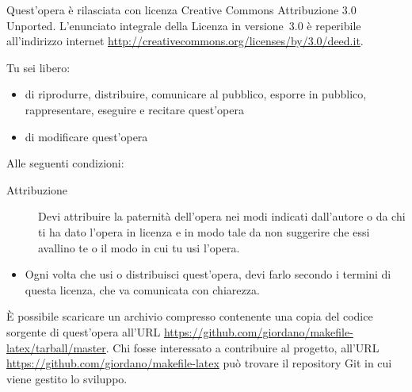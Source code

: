 \noindent Quest'opera è rilasciata con licenza Creative Commons Attribuzione 3.0
Unported.  L'enunciato integrale della Licenza in versione~3.0 è reperibile
all'indirizzo internet \url{http://creativecommons.org/licenses/by/3.0/deed.it}.

Tu sei libero:
\begin{itemize}
\item di riprodurre, distribuire, comunicare al pubblico, esporre in pubblico,
  rappresentare, eseguire e recitare quest'opera
\item di modificare quest'opera
\end{itemize}
Alle seguenti condizioni:
\begin{description}
\item[Attribuzione] Devi attribuire la paternità dell'opera nei modi indicati
  dall'autore o da chi ti ha dato l'opera in licenza e in modo tale da non
  suggerire che essi avallino te o il modo in cui tu usi l'opera.
\end{description}

\begin{itemize}
\item Ogni volta che usi o distribuisci quest'opera, devi farlo secondo i
  termini di questa licenza, che va comunicata con chiarezza.
\end{itemize}

\vfill

È possibile scaricare un archivio compresso contenente una copia del codice
sorgente di quest'opera all'URL
\url{https://github.com/giordano/makefile-latex/tarball/master}.  Chi fosse
interessato a contribuire al progetto, all'URL
\url{https://github.com/giordano/makefile-latex} può trovare il repository Git
in cui viene gestito lo sviluppo.

